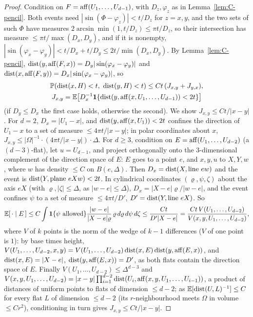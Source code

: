 \begin{proof}
Condition on $F = \operatorname{aff}(U_1, \dots, U_{d-1})$, with $D_z, \varphi_z$ as in Lemma~\ref{lem:C-pencil}. Both events need
$|\sin(\Phi - \varphi_z)| < t/D_z$ for $z = x, y$, and the two sets of such $\Phi$ have measures $2\arcsin\min(1, t/D_z) \le \pi t/D_z$, so their intersection has measure
$\le \pi t/\max(D_x, D_y)$, and if it is nonempty,
$|\sin(\varphi_x - \varphi_y)| < t/D_x + t/D_y \le 2t/\min(D_x, D_y)$. By Lemma~\ref{lem:C-pencil},
$\operatorname{dist}(y, \operatorname{aff}(F, x)) = D_y|\sin(\varphi_x - \varphi_y)|$ and $\operatorname{dist}(x, \operatorname{aff}(F, y)) = D_x|\sin(\varphi_x - \varphi_y)|$, so
\begin{gather*}
  \mathbb{P}(\operatorname{dist}(x, H) < t,\ \operatorname{dist}(y, H) < t) \le Ct\,(J_{x,y} + J_{y,x}),\\
  J_{x,y} = \mathbb{E}\bigl[D_x^{-1}\mathbf{1}\{\operatorname{dist}(y, \operatorname{aff}(x, U_1, \dots, U_{d-1})) < 2t\}\bigr]
\end{gather*}
(if $D_y \le D_x$ the first case holds, otherwise the second). We show $J_{x,y} \le Ct/|x - y|$. For $d = 2$,
$D_x = |U_1 - x|$, and $\operatorname{dist}(y, \operatorname{aff}(x, U_1)) < 2t$ confines the direction of $U_1 - x$ to a set of measure
$\le 4\pi t/|x - y|$; in polar coordinates about $x$, $J_{x,y} \le |\Omega|^{-1}\cdot(4\pi t/|x - y|)\cdot\Delta$.
For $d \ge 3$, condition on $E = \operatorname{aff}(U_1, \dots, U_{d-2})$ (a $(d-3)$-flat), let $u = U_{d-1}$, and project
orthogonally onto the $3$-dimensional complement of the direction space of $E$: $E$ goes to a point $e$, and $x, y, u$ to
$X, Y, w$, where $w$ has density $\le C$ on $B(e, \Delta)$. Then $D_x = \operatorname{dist}(X, \text{line }ew)$ and the event is
$\operatorname{dist}(Y, \text{plane }eXw) < 2t$. In cylindrical coordinates $(\varrho, \psi, \zeta)$ about the axis $eX$ (with $\varrho, |\zeta| \le \Delta$, as $|w - e| \le \Delta$),
$D_x = |X - e|\varrho/|w - e|$, and the event confines $\psi$ to a set of measure $\le 4\pi t/D'$, $D' = \operatorname{dist}(Y, \text{line }eX)$. So
\[
  \mathbb{E}[\,\cdot \mid E\,] \le C\int\mathbf{1}\{\psi\text{ allowed}\}\frac{|w - e|}{|X - e|\varrho}\,\varrho\,d\varrho\,d\psi\,d\zeta
  \le \frac{Ct}{D'|X - e|} = \frac{Ct\,V(U_1, \dots, U_{d-2})}{V(x, y, U_1, \dots, U_{d-2})},
\]
where $V$ of $k$ points is the norm of the wedge of $k - 1$ differences ($V$ of one point is $1$): by base times height,
$V(U_1, \dots, U_{d-2}, x, y) = V(U_1, \dots, U_{d-2})\operatorname{dist}(x, E)\operatorname{dist}(y, \operatorname{aff}(E, x))$, and $\operatorname{dist}(x, E) = |X - e|$,
$\operatorname{dist}(y, \operatorname{aff}(E, x)) = D'$, as both flats contain the direction space of $E$. Finally $V(U_1, \dots, U_{d-2}) \le \Delta^{d-3}$ and
$V(x, y, U_1, \dots, U_{d-2}) = |x - y|\prod_{i=1}^{d-2}\operatorname{dist}(U_i, \operatorname{aff}(x, y, U_1, \dots, U_{i-1}))$, a product of distances
of uniform points to flats of dimension $\le d - 2$; as $\mathbb{E}[\operatorname{dist}(U, L)^{-1}] \le C$ for every flat $L$ of dimension
$\le d - 2$ (its $r$-neighbourhood meets $\Omega$ in volume $\le Cr^2$), conditioning in turn gives $J_{x,y} \le Ct/|x - y|$.
\end{proof}

